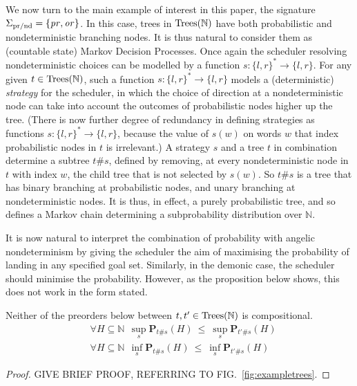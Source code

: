 We now turn to the main example of interest in this paper, the signature $\Sigma_{\text{pr/nd}} = \{\operatorname{\mathit{pr}},\operatorname{\mathit{or}}\}$.
In this case, trees in $\textnormal{Trees}(\mathbb{N})$ have both probabilistic and nondeterministic branching nodes.
It is thus natural to consider them as (countable state) Markov Decision Processes. Once again the 
scheduler resolving nondeterministic
choices can be modelled by a 
function $s: \{l,r\}^* \to \{l,r\}$. For any given $t \in \textnormal{Trees}(\mathbb{N})$, such a function
$s: \{l,r\}^* \to \{l,r\}$ models a (deterministic) \emph{strategy} for the scheduler, in which the choice of direction at a nondeterministic node  
can take into account the outcomes of probabilistic nodes higher up the tree.
(There is now further degree of redundancy in defining strategies as functions $s: \{l,r\}^* \to \{l,r\}$, because the value of $s(w)$ on words $w$ that index 
probabilistic nodes in $t$ is irrelevant.) A strategy $s$ and a tree $t$ in combination determine a subtree $t\#s$, defined by 
removing, at every nondeterministic node in $t$ with index $w$, the child tree that is not selected by $s(w)$. So $t\#s$ is a tree that has binary branching at probabilistic nodes, and unary branching at nondeterministic nodes. It is thus, in effect, a purely probabilistic tree, and so defines a Markov chain determining a subprobability distribution over $\mathbb{N}$. 

It is now natural to interpret the combination of probability with angelic nondeterminism 
by giving the scheduler the aim of maximising the probability of landing in any specified goal set. Similarly, in the demonic case, the scheduler should minimise the probability. However, as the proposition below shows, 
this does not work in the form stated. 
\begin{proposition}
Neither of the preorders below between $t,t' \in \textnormal{Trees}(\mathbb{N})$ is compositional.
\begin{align*}
& \forall H \subseteq \mathbb{N}  ~~ \sup_s  \mathbf{P}_{t\#s} (H)~ \leq~ \sup_s \mathbf{P}_{t'\#s} (H)
\\
& \forall H \subseteq \mathbb{N}  ~~ \inf_s  \mathbf{P}_{t\#s} (H)~ \leq~ \inf_s \mathbf{P}_{t'\#s} (H)
\end{align*}
\end{proposition}

\begin{proof}
GIVE BRIEF PROOF, REFERRING TO FIG.~\ref{fig:exampletrees}.
\end{proof}

